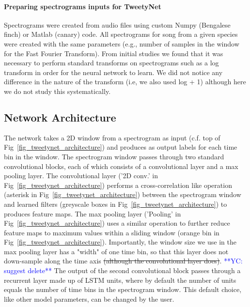 \documentclass[10pt,letterpaper]{article}
\begin{document}
\paragraph{Preparing spectrograms inputs for TweetyNet}
Spectrograms were created from audio files using custom Numpy (Bengalese finch) or Matlab (canary) code.
All spectrograms for song from a given species were created with the same parameters (e.g., number of 
samples in the window for the Fast Fourier Transform). From initial studies we found that it was necessary 
to perform standard transforms on spectrograms such as a log transform in order for the neural network to 
learn. We did not notice any difference in the nature of the transform (i.e, we also used log + 1) 
although here we do not study this systematically.

\subsection*{Network Architecture}
The network takes a 2D window from a spectrogram as input (c.f. top of Fig~\ref{fig_tweetynet_architecture}) and produces as output 
labels for each time bin in the window. 
The spectrogram window passes through two standard convolutional blocks, 
each of which consists of a convolutional layer and a max pooling layer. 
The convolutional layer ('2D conv.' in Fig~\ref{fig_tweetynet_architecture}) performs a cross-correlation
like operation (asterisk in Fig~\ref{fig_tweetynet_architecture}) between the spectrogram window and learned filters (greyscale boxes in Fig~\ref{fig_tweetynet_architecture}) to produces feature maps.
The max pooling layer ('Pooling' in Fig~\ref{fig_tweetynet_architecture}) uses a similar operation to further reduce feature maps to maximum values within a sliding 
window (orange bin in Fig~\ref{fig_tweetynet_architecture}). Importantly, the window size we use in the max pooling layer has a "width" of one time bin, so that this 
layer does not down-sample along the time axis \st{(although the convolutional layer does)}. \textcolor{blue}{**YC: suggest delete**}
The output of the second convolutional block passes through a recurrent layer made up of LSTM units, where by default
the number of units equals the number of time bins in the spectrogram window. This default choice, like other model parameters, can be changed by the user.
\end{document}
